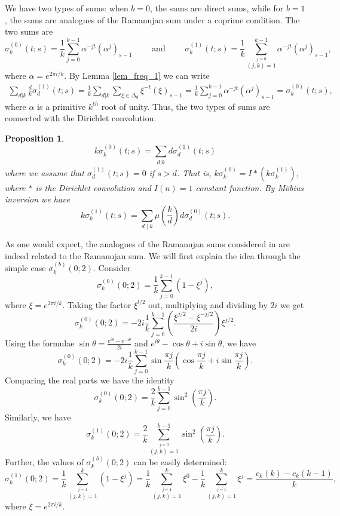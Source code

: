 \documentclass[12pt]{article}
\newtheorem{prop}[thm]{Proposition}%
\begin{document}
We have two types of sums: when \( b = 0 \), the sums are direct sums, while for \( b = 1 \), the sums are analogues of the Ramanujan sum under a coprime condition. The two sums are 
$$
\sigma^{(0)}_{k}(t;s) = \frac{1}{k}\sum_{j=0}^{k-1}\alpha^{-jt}(\alpha^{j})_{s-1} \quad\quad\text{ and }\quad\quad \sigma^{(1)}_{k}(t;s) = \frac{1}{k}\sum_{\stackrel{j=0}{(j,k)=1}}^{k-1}\alpha^{-jt}(\alpha^{j})_{s-1},
$$
where $\alpha = e^{2\pi i/k}$. By Lemma \ref{lem_freq_1} we can write
\begin{eqnarray}
\nonumber \sum_{d|k}\frac{d}{k}\sigma^{(1)}_{d}(t;s) = \frac{1}{k}\sum_{d|k}\sum_{\xi\in \Delta_{d}}\xi^{-t}(\xi)_{s-1} = \frac{1}{k}\sum_{j=0}^{k-1}\alpha^{-jt}(\alpha^{j})_{s-1}=\sigma_{k}^{(0)}(t;s),
\end{eqnarray}
where $\alpha$ is a primitive $k^{th}$ root of unity. Thus, the two types of sums are connected with the Dirichlet convolution.

\begin{prop} 
$$
    k\sigma_{k}^{(0)}(t;s)=\sum_{d|k}d\sigma^{(1)}_{d}(t;s)
$$
where we assume that $\sigma^{(1)}_{d}(t;s)=0$ if $s>d$. That is, $k\sigma_{k}^{(0)}=I*(k\sigma^{(1)}_{k})$, where $*$ is the Dirichlet convolution and $I(n)=1$ constant function. By Möbius inversion we have
\[
k \sigma_{k}^{(1)}(t; s) = \sum_{d \mid k} \mu\left(\frac{k}{d}\right) d \sigma_{d}^{(0)}(t; s).
\]
 
\end{prop}

As one would expect, the analogues of the Ramanujan sums considered in \cite{bruce} are indeed related to the Ramanujan sum. We will first explain the idea through the simple case $\sigma_{k}^{(b)}(0;2)$. Consider 
$$
\sigma^{(0)}_{k}(0;2) = \frac{1}{k}\sum_{j=0}^{k-1}(1-\xi^{j}),
$$
where $\xi=e^{2\pi i/k}$. Taking the factor $\xi^{l/2}$ out, multiplying and dividing by $2i$ we get 
$$
\sigma^{(0)}_{k}(0;2) = -2i\frac{1}{k}\sum_{j=0}^{k-1}\left(\frac{\xi^{j/2}-\xi^{-j/2}}{2i}\right)\xi^{j/2}.
$$
Using the formulae $\sin \theta=\frac{e^{i\theta}-e^{-i\theta}}{2i}$ and $e^{i\theta}-\cos \theta + i \sin \theta$, we have 
$$
\sigma^{(0)}_{k}(0;2) = -2i\frac{1}{k}\sum_{j=0}^{k-1}\sin \frac{\pi j}{k}(\cos \frac{\pi j}{k}+i\sin \frac{\pi j}{k}).
$$
Comparing the real parts we have the identity
$$
\sigma^{(0)}_{k}(0;2) = \frac{2}{k}\sum_{j=0}^{k-1} \sin^{2}\left(\frac{\pi j}{k}\right).
$$
Similarly, we have  
$$
\sigma^{(1)}_{k}(0;2) = \frac{2}{k}\sum_{\stackrel{j=0}{(j,k)=1}}^{k-1} \sin^{2}\left(\frac{\pi j}{k}\right).
$$
Further, the values of $\sigma_{k}^{(b)}(0;2)$ can be easily determined: 
$$
\sigma^{(1)}_{k}(0;2)=\frac{1}{k}\sum^{k}_{\stackrel{j=1}{(j,k)=1}}(1-\xi^{j})=\frac{1}{k}\sum^{k}_{\stackrel{j=1}{(j,k)=1}}\xi^{0}-\frac{1}{k}\sum^{k}_{\stackrel{j=1}{(j,k)=1}}\xi^{j}=\frac{c_{k}(k)-c_{k}(k-1)}{k},
$$
where $\xi=e^{2\pi i/k}$.
\end{document}
